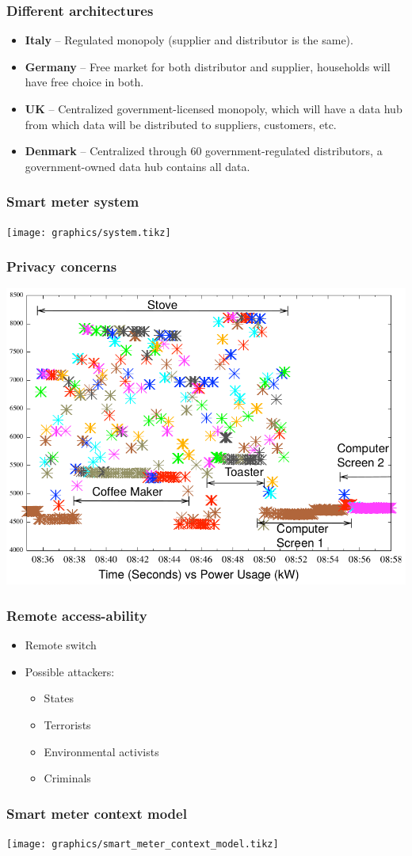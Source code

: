 \begin{frame}
  \frametitle{Different architectures}
  \begin{itemize}
	\item \textbf{Italy} -- Regulated monopoly (supplier and distributor is the same).
	\item \textbf{Germany} -- Free market for both distributor and supplier, households will have free choice in both.
	\item \textbf{UK} -- Centralized government-licensed monopoly, which will have a data hub from which data will be distributed to suppliers, customers, etc.
	\item \textbf{Denmark} -- Centralized through 60 government-regulated distributors, a government-owned data hub contains all data.
\end{itemize}

\end{frame}

\begin{frame}
  \frametitle{Smart meter system}
  \texttt{[image: graphics/system.tikz]}
\end{frame}

\begin{frame}
  \frametitle{Privacy concerns}
  \includegraphics[width=.8\textwidth]{graphics/detailed.png}
\end{frame}

\begin{frame}
  \frametitle{Remote access-ability}
  \begin{itemize}
  \item Remote switch
  \item Possible attackers:
    \begin{itemize}
    \item States
    \item Terrorists
    \item Environmental activists
    \item Criminals
    \end{itemize}
  \end{itemize}
\end{frame}

\begin{frame}
  \frametitle{Smart meter context model}
  \texttt{[image: graphics/smart\_meter\_context\_model.tikz]}
\end{frame}

